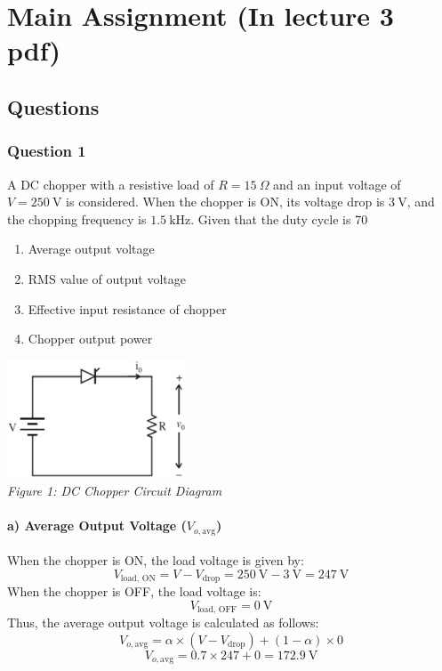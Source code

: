 \documentclass[12pt]{report}
\begin{document}
	\justifying
	
	\chapter*{Main Assignment (In lecture 3 pdf)}
	
	\section*{Questions}

	
	
	
	
	
	
	\subsection*{Question 1}
	A DC chopper with a resistive load of $R = 15 \ \Omega$ and an input voltage of $V = 250 \ \text{V}$ is considered. When the chopper is ON, its voltage drop is $3 \ \text{V}$, and the chopping frequency is $1.5 \ \text{kHz}$. Given that the duty cycle is 70%
	\begin{enumerate}
		\item Average output voltage
		\item RMS value of output voltage
		\item Effective input resistance of chopper
		\item Chopper output power
	\end{enumerate}
	
	\begin{center}
		\includegraphics[width=0.4\textwidth]{Picture1.png}
		\\[1em]
		\textit{Figure 1: DC Chopper Circuit Diagram}
	\end{center}
	




     \subsubsection*{a) Average Output Voltage (\( V_{o,\text{avg}} \))}
     When the chopper is ON, the load voltage is given by:
     \[
     V_{\text{load, ON}} = V - V_{\text{drop}} = 250 \ \text{V} - 3 \ \text{V} = 247 \ \text{V}
     \]
     When the chopper is OFF, the load voltage is:
     \[
     V_{\text{load, OFF}} = 0 \ \text{V}
     \]
     Thus, the average output voltage is calculated as follows:
     \[
     V_{o,\text{avg}} = \alpha \times (V - V_{\text{drop}}) + (1 - \alpha) \times 0
     \]
     \[
     V_{o,\text{avg}} = 0.7 \times 247 + 0 = 172.9 \ \text{V}
     \]
     
\end{document}
